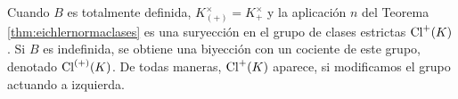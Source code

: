 %
%

Cuando $B$ es totalmente definida, $K_{(+)}^{\times}=K_{+}^{\times}$ y la
aplicaci\'{o}n $n$ del Teorema \ref{thm:eichlernormaclases} es una
suryecci\'{o}n en el grupo de clases estrictas $\pClass{K}$. Si $B$ es
indefinida, se obtiene una biyecci\'{o}n con un cociente de este grupo,
denotado $\Class[(+)]{K}$. De todas maneras, $\pClass{K}$ aparece, si
modificamos el grupo actuando a izquierda.

